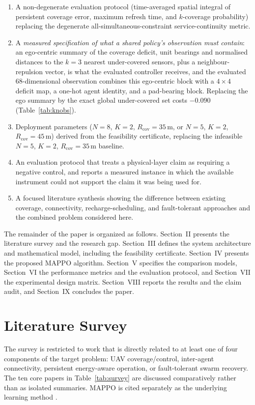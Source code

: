 \documentclass[conference]{IEEEtran}
\begin{document}
\begin{enumerate}
    \item A non-degenerate evaluation protocol (time-averaged spatial integral of persistent coverage error, maximum refresh time, and $k$-coverage probability) replacing the degenerate all-simultaneous-constraint service-continuity metric.
    \item A \emph{measured specification of what a shared policy's observation must contain}: an ego-centric summary of the coverage deficit, unit bearings and normalised distances to the $k=3$ nearest under-covered sensors, plus a neighbour-repulsion vector, is what the evaluated controller receives, and the evaluated 68-dimensional observation combines this ego-centric block with a $4\times4$ deficit map, a one-hot agent identity, and a pad-bearing block.  Replacing the ego summary by the exact global under-covered set costs $-0.090$ (Table~\ref{tab:knobs}).
    \item Deployment parameters ($N=8$, $K=2$, $R_{\mathrm{cov}}=35\,\mathrm{m}$, or $N=5$, $K=2$, $R_{\mathrm{cov}}=45\,\mathrm{m}$) derived from the feasibility certificate, replacing the infeasible $N=5$, $K=2$, $R_{\mathrm{cov}}=35\,\mathrm{m}$ baseline.
    \item An evaluation protocol that treats a physical-layer claim as requiring a negative control, and reports a measured instance in which the available instrument could not support the claim it was being used for.
    \item A focused literature synthesis showing the difference between existing coverage, connectivity, recharge-scheduling, and fault-tolerant approaches and the combined problem considered here.
\end{enumerate}

The remainder of the paper is organized as follows. Section~II presents the literature survey and the research gap. Section~III defines the system architecture and mathematical model, including the feasibility certificate. Section~IV presents the proposed MAPPO algorithm. Section~V specifies the comparison models, Section~VI the performance metrics and the evaluation protocol, and Section~VII the experimental design matrix. Section~VIII reports the results and the claim audit, and Section~IX concludes the paper.

\section{Literature Survey}
\label{sec:litsurvey}
The survey is restricted to work that is directly related to at least one of four components of the target problem: UAV coverage/control, inter-agent connectivity, persistent energy-aware operation, or fault-tolerant swarm recovery. The ten core papers in Table~\ref{tab:survey} are discussed comparatively rather than as isolated summaries. MAPPO is cited separately as the underlying learning method \cite{yu2022}.
\end{document}

